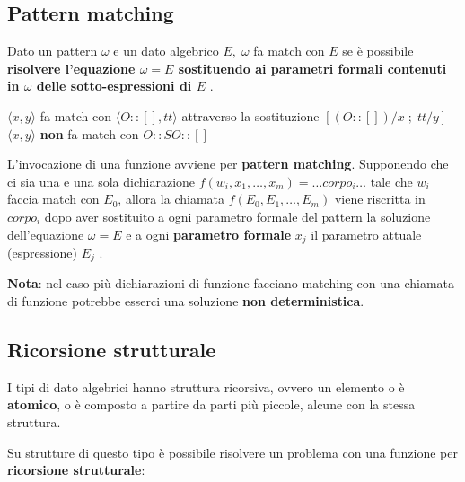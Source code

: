 \documentclass[
  a4paper,
]{article}
\begin{document}
\hypertarget{pattern-matching}{%
\subsection{Pattern matching}\label{pattern-matching}}

Dato un pattern \(\omega\) e un dato algebrico \(E,\; \omega\) fa match
con \(E\) se è possibile \textbf{risolvere l'equazione \(\omega = E\)
sostituendo ai parametri formali contenuti in \(\omega\) delle
sotto-espressioni di \(E\)} .

\begin{examplebox}[Esempio]

\(\langle x, y \rangle\) fa match con \(\langle O::[], tt \rangle\)
attraverso la sostituzione \([(O::[])/x \; ; \; tt/y]\)\\
\(\langle x, y \rangle\) \textbf{non} fa match con \(O::SO::[]\)

\end{examplebox}

L'invocazione di una funzione avviene per \textbf{pattern matching}.
Supponendo che ci sia una e una sola dichiarazione
\(f(w_i, x_1, \dots, x_m) = \dots corpo_i \dots\) tale che \(w_i\)
faccia match con \(E_0\), allora la chiamata \(f(E_0, E_1, \dots, E_m)\)
viene riscritta in \(corpo_i\) dopo aver sostituito a ogni parametro
formale del pattern la soluzione dell'equazione \(\omega = E\) e a ogni
\textbf{parametro formale} \(x_j\) il parametro attuale (espressione)
\(E_j\) .

\textbf{Nota}: nel caso più dichiarazioni di funzione facciano matching
con una chiamata di funzione potrebbe esserci una soluzione \textbf{non
deterministica}.

\hypertarget{ricorsione-strutturale}{%
\subsection{Ricorsione strutturale}\label{ricorsione-strutturale}}

I tipi di dato algebrici hanno struttura ricorsiva, ovvero un elemento o
è \textbf{atomico}, o è composto a partire da parti più piccole, alcune
con la stessa struttura.

Su strutture di questo tipo è possibile risolvere un problema con una
funzione per \textbf{ricorsione strutturale}:
\end{document}
